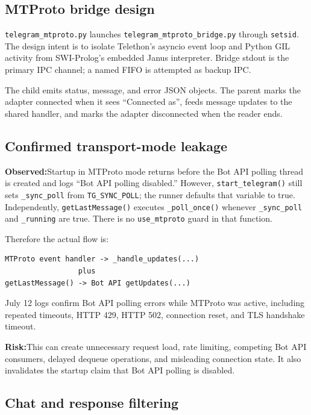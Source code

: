 \documentclass[10pt]{article}
\newcommand{\code}[1]{\texttt{#1}}
\newcommand{\observed}{\textbf{Observed:}}
\newcommand{\risk}{\textbf{Risk:}}
\begin{document}
\subsection{MTProto bridge design}

\code{telegram\_mtproto.py} launches \code{telegram\_mtproto\_bridge.py} through \code{setsid}. The design intent is to isolate Telethon's asyncio event loop and Python GIL activity from SWI-Prolog's embedded Janus interpreter. Bridge stdout is the primary IPC channel; a named FIFO is attempted as backup IPC.

The child emits status, message, and error JSON objects. The parent marks the adapter connected when it sees ``Connected as'', feeds message updates to the shared handler, and marks the adapter disconnected when the reader ends.

\subsection{Confirmed transport-mode leakage}

\observed Startup in MTProto mode returns before the Bot API polling thread is created and logs ``Bot API polling disabled.'' However, \code{start\_telegram()} still sets \code{\_sync\_poll} from \code{TG\_SYNC\_POLL}; the runner defaults that variable to true. Independently, \code{getLastMessage()} executes \code{\_poll\_once()} whenever \code{\_sync\_poll} and \code{\_running} are true. There is no \code{use\_mtproto} guard in that function.

Therefore the actual flow is:
\begin{lstlisting}
MTProto event handler -> _handle_updates(...)
                 plus
getLastMessage() -> Bot API getUpdates(...)
\end{lstlisting}

July 12 logs confirm Bot API polling errors while MTProto was active, including repeated timeouts, HTTP 429, HTTP 502, connection reset, and TLS handshake timeout.

\risk This can create unnecessary request load, rate limiting, competing Bot API consumers, delayed dequeue operations, and misleading connection state. It also invalidates the startup claim that Bot API polling is disabled.

\subsection{Chat and response filtering}
\end{document}
